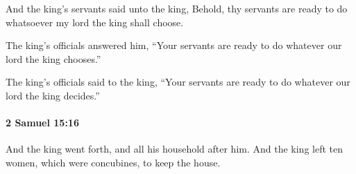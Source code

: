 			\begin{versebox}
					\item[BHS] 
					\item[ASV] And the king's servants said unto the king, Behold, thy servants are ready to do whatsoever my lord the king shall choose.
					\item[NIV] The king’s officials answered him, “Your servants are ready to do whatever our lord the king chooses.”
					\item[NRSV] The king’s officials said to the king, “Your servants are ready to do whatever our lord the king decides.”
			\end{versebox}

		\paragraph{2 Samuel 15:16} %
			\label{2SAMUEL-15-16}

			And the king went forth, and all his household after him. And the king left ten women, which were concubines, to keep the house.

